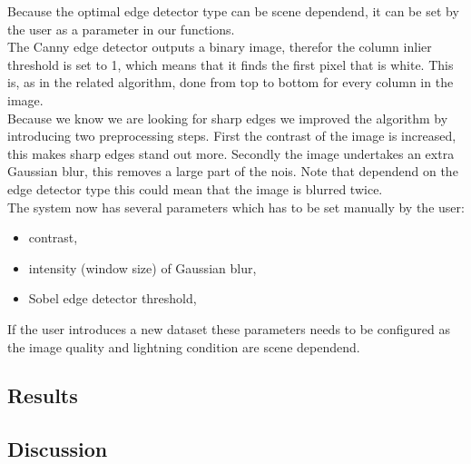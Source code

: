 Because the optimal edge detector type can be scene dependend, it can be set
by the user as a parameter in our functions.\\

The Canny edge detector outputs a binary image, therefor the column inlier
threshold is set to 1, which means that it finds the first pixel that is white. 
This is, as in the related algorithm, done from top to bottom for every column in
the image.\\

Because we know we are looking for sharp edges we improved the algorithm by
introducing two preprocessing steps. First the contrast of the image is
increased, this makes sharp edges stand out more.  Secondly the image undertakes
an extra Gaussian blur, this removes a large part of the nois. Note that
dependend on the edge detector type this could mean that the image is blurred
twice.\\


The system now has several parameters which has to be set manually by the user:
\begin{itemize}
	\item contrast,
	\item intensity (window size) of Gaussian blur,
	\item Sobel edge detector threshold,
\end{itemize}

If the user introduces a new dataset these parameters needs to be configured
as the image quality and lightning condition are scene dependend.


\subsection{Results}%

\subsection{Discussion}  %
